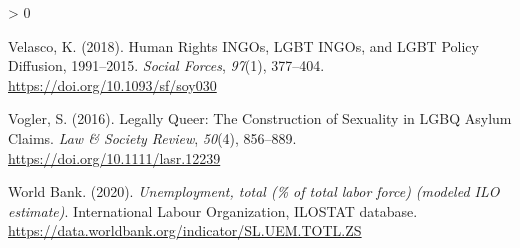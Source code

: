 \documentclass[
  11pt,
]{article}
\newlength{\cslhangindent}
\newenvironment{CSLReferences}[2] %
 {%
  \setlength{\parindent}{0pt}
  \ifodd #1 \everypar{\setlength{\hangindent}{\cslhangindent}}\ignorespaces\fi
  \ifnum #2 > 0
  \setlength{\parskip}{#2\baselineskip}
  \fi
 }%
 {}
\begin{document}
\begin{CSLReferences}{1}{0}
\leavevmode\hypertarget{ref-velasco_2018}{}%
Velasco, K. (2018). Human {Rights} {INGOs}, {LGBT} {INGOs}, and {LGBT} {Policy} {Diffusion}, 1991--2015. \emph{Social Forces}, \emph{97}(1), 377--404. \url{https://doi.org/10.1093/sf/soy030}

\leavevmode\hypertarget{ref-vogler_2016}{}%
Vogler, S. (2016). Legally {Queer}: {The} {Construction} of {Sexuality} in {LGBQ} {Asylum} {Claims}. \emph{Law \& Society Review}, \emph{50}(4), 856--889. \url{https://doi.org/10.1111/lasr.12239}

\leavevmode\hypertarget{ref-worldbank_2020}{}%
World Bank. (2020). \emph{Unemployment, total (\% of total labor force) (modeled {ILO} estimate)}. International Labour Organization, ILOSTAT database. \url{https://data.worldbank.org/indicator/SL.UEM.TOTL.ZS}

\end{CSLReferences}
\end{document}
